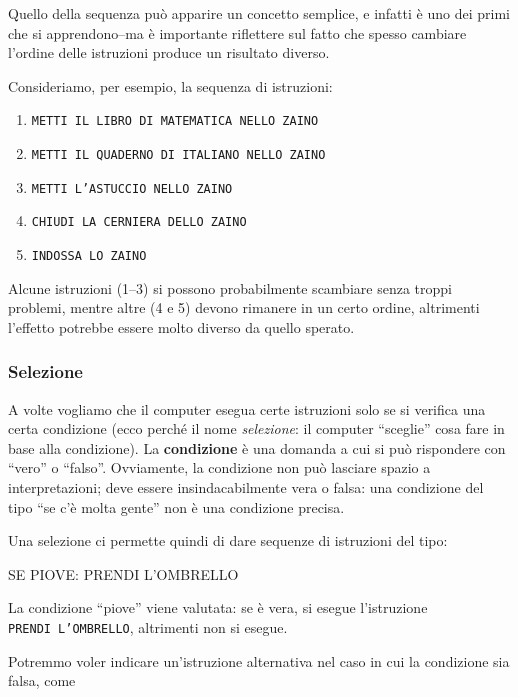 Quello della sequenza può apparire un concetto semplice, e infatti è uno dei primi che si apprendono--ma è importante riflettere sul fatto che spesso cambiare l'ordine delle istruzioni produce un risultato diverso.

Consideriamo, per esempio, la sequenza di istruzioni:

\begin{enumerate}
\item
  \texttt{METTI IL LIBRO DI MATEMATICA NELLO ZAINO}
\item
  \texttt{METTI IL QUADERNO DI ITALIANO NELLO ZAINO}
\item
  \texttt{METTI L'ASTUCCIO NELLO ZAINO}
\item
  \texttt{CHIUDI LA CERNIERA DELLO ZAINO}
\item
  \texttt{INDOSSA LO ZAINO}
\end{enumerate}

Alcune istruzioni (1--3) si possono probabilmente scambiare senza troppi problemi, mentre altre (4 e 5) devono rimanere in un certo ordine, altrimenti l'effetto potrebbe essere molto diverso da quello sperato.


\subsubsection{Selezione}


A volte vogliamo che il computer esegua certe istruzioni solo se si verifica una certa condizione (ecco perché il nome \emph{selezione}: il computer ``sceglie'' cosa fare in base alla condizione). La \textbf{condizione} è una domanda a cui si può rispondere con ``vero'' o ``falso''. Ovviamente, la condizione non può lasciare spazio a interpretazioni; deve essere insindacabilmente vera o falsa: una condizione del tipo ``se c'è molta gente'' non è una condizione precisa.

Una selezione ci permette quindi di dare sequenze di istruzioni del tipo:

\begin{pseudocodice}
SE PIOVE:
    PRENDI L'OMBRELLO
\end{pseudocodice}

La condizione ``piove'' viene valutata: se è vera, si esegue l'istruzione \\\texttt{PRENDI L'OMBRELLO}, altrimenti non si esegue.

Potremmo voler indicare un'istruzione alternativa nel caso in cui la condizione sia falsa, come

